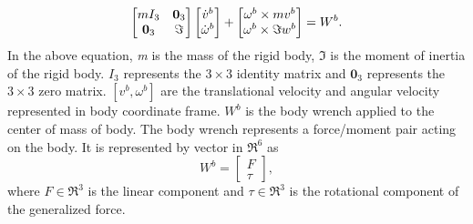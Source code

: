 \begin{equation}
\label{eq:dyn_rig_bdy}
\begin{bmatrix}
mI_3 & \textbf{0}_3 \\ \textbf{0}_3 &\Im
\end{bmatrix}
\begin{bmatrix}
\dot{v}^b\\ \dot{\omega}^b
\end{bmatrix}
+ \begin{bmatrix}
\omega^b \times mv^b \\ 
\omega^b \times \Im w^b
\end{bmatrix}
= W^b.\\
\end{equation}
In the above equation, \emph{m} is the mass of the rigid body, $\Im$ is the moment of inertia of the rigid body. $I_3$ represents the $3 \times 3$ identity matrix and $ \textbf{0}_3$ represents the  $3 \times 3$ zero matrix. $[{v}^b,{\omega}^b]$ are the translational velocity and angular velocity represented in body coordinate frame. $W^b$ is the body wrench applied to the center of mass of body. The body wrench represents a force/moment pair acting on the body. It is represented by vector in $\Re^6$ as \citep{mur94}
$$ W^b = \begin{bmatrix} F \\ \tau \end{bmatrix}, $$ where $F \in \Re^3$ is the linear component and $\tau \in \Re^3$ is the rotational component of the generalized force.

